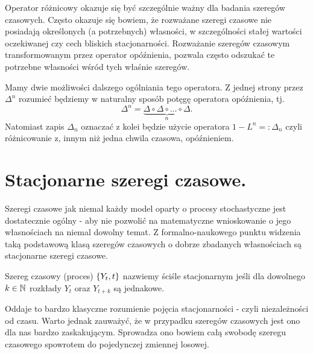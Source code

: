 \documentclass[10pt,a4paper]{book}
\begin{document}
Operator różnicowy okazuje się być szczególnie ważny dla badania szeregów czasowych. Często okazuje się bowiem, że rozważane szeregi czasowe nie posiadają określonych (a potrzebnych) własności, w szczególności stałej wartości oczekiwanej czy cech bliskich stacjonarności. Rozważanie szeregów czasowym transformowanym przez operator opóźnienia, pozwala często odszukać te potrzebne własności wśród tych właśnie szeregów.

Mamy dwie możliwości dalszego ogólniania tego operatora. Z jednej strony przez $\Delta^n$ rozumieć będziemy w naturalny sposób potęgę operatora opóźnienia, tj.
$$
\Delta^n = \underbrace{\Delta \circ \Delta \circ \ldots \circ \Delta}_{n}.
$$
Natomiast zapis $\Delta_n$ oznaczać z kolei będzie użycie operatora $1 - L^n =: \Delta_n$ czyli różnicowanie z, innym niż jedna chwila czasowa, opóźnieniem.

\section{Stacjonarne szeregi czasowe.}

Szeregi czasowe jak niemal każdy model oparty o procesy stochastyczne jest dostatecznie ogólny - aby nie pozwolić na matematyczne wnioskowanie o jego własnościach na niemal dowolny temat. Z formalno-naukowego punktu widzenia taką podstawową klasą szeregów czasowych o dobrze zbadanych własnościach są stacjonarne szeregi czasowe.  

\begin{definition}
Szereg czasowy (proces) $\left\lbrace {{Y_t}, {t}} \right\rbrace$ nazwiemy ściśle stacjonarnym jeśli dla dowolnego $k \in \mathbb{N}$ rozkłady $Y_t$ oraz $Y_{t+k}$ są jednakowe.
\end{definition}

Oddaje to bardzo klasyczne rozumienie pojęcia stacjonarności - czyli niezależności od czasu. Warto jednak zauważyć, że w przypadku szeregów czasowych jest ono dla nas bardzo zaskakującym. Sprowadza ono bowiem całą swobodę szeregu czasowego spowrotem do pojedynczej zmiennej losowej. 
\end{document}
